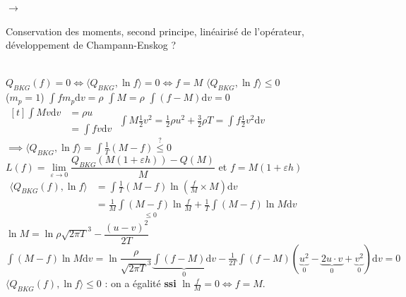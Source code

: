 \documentclass[12pt,a4paper]{article}
\begin{document}
$\to$ \begin{minipage}[t]{15cm}
	Conservation des moments, second principe, linéairisé de l'opérateur, développement de Champann-Enskog ?
\end{minipage}\\

$Q_{BKG}(f) = 0 \iff \langle Q_{BKG},\ln f\rangle = 0 \iff f=M$ \hspace{1cm} $\langle Q_{BKG}, \ln f\rangle \leq 0$\\

($m_p = 1$) $\displaystyle\int fm_p \mathrm dv= \rho$ \hspace{1cm} $\displaystyle\int M = \rho$ \hspace{1cm} $\displaystyle\int (f-M)\mathrm dv = 0$\\

$\begin{aligned}[t]
	\displaystyle\int Mv\mathrm dv &= \rho u \\
	&= \int fv \mathrm dv
\end{aligned}$ \hspace{1cm} $\displaystyle\int M\frac12 v^2 = \frac12 \rho u^2 + \frac32 \rho T = \int f\frac12 v^2 \mathrm dv$\\

\underline{$\implies \langle Q_{BKG},\ln f\rangle = \displaystyle\int \frac1T (M-f) \overset?\leq 0$}\\

$L(f) = \underset{\varepsilon\to0}\lim \dfrac{Q_{BKG}(M(1+\varepsilon h))-Q(M)}M$ et $f = M(1+\varepsilon h)$\\

$\begin{aligned}
	\langle Q_{BKG}(f),\ln f\rangle &= \displaystyle\int \frac1T (M-f)\ln\left(\frac f M \times M\right)\mathrm dv \\
	&= \underset{\leq 0}{\frac1M \int (M-f)\ln \frac fM} + \frac1T \int (M-f)\ln M \mathrm dv
\end{aligned}$\\

$\ln M = \ln \rho \sqrt{2\pi T}^3-\dfrac{(u-v)^2}{2T}$\\
$\displaystyle\int (M-f)\ln M \mathrm dv =\ln \dfrac\rho{\sqrt{2\pi T}^3} \underbrace{\int (f-M)\mathrm dv}_{0} -\frac1{2T}\int (f-M)(\underbrace{u^2}_0 - \underbrace{2u\cdot v}_0+\underbrace{v^2}_0)\mathrm dv = 0$\\

$\langle Q_{BKG}(f),\ln f\rangle \leq 0$ : on a égalité \textbf{ssi} $\ln \frac fM = 0 \iff f = M$.
\end{document}
